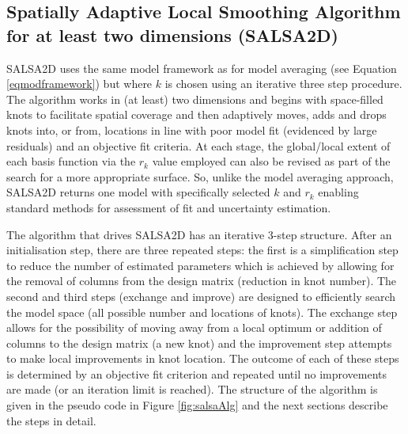 \documentclass[letterpaper]{interact}
\begin{document}
\subsection{Spatially Adaptive Local Smoothing Algorithm for at least two dimensions (SALSA2D)}\label{spatially-adaptive-local-smoothing-algorithm-for-at-least-two-dimensions-salsa2d}

SALSA2D uses the same model framework as for model averaging (see Equation \ref{eqmodframework}) but where $k$ is chosen using an iterative three step procedure. The algorithm works in (at least) two dimensions and begins with space-filled knots to facilitate spatial coverage and then adaptively moves, adds and drops knots into, or from, locations in line with poor model fit (evidenced by large residuals) and an objective fit criteria. At each stage, the global/local extent of each basis function via the \(r_k\) value employed can also be revised as part of the search for a more appropriate surface. So, unlike the model averaging approach, SALSA2D returns one model with specifically selected $k$ and $r_k$ enabling standard methods for assessment of fit and uncertainty estimation. 

The algorithm that drives SALSA2D has an iterative 3-step structure. After an initialisation step, there are three repeated steps: the first is a simplification step to reduce the number of estimated parameters which is achieved by allowing for the removal of columns from the design matrix (reduction in knot number). The second and third steps (exchange and improve) are designed to efficiently search the model space (all possible number and locations of knots). The exchange step allows for the possibility of moving away from a local optimum or addition of columns to the design matrix (a new knot) and the improvement step attempts to make local improvements in knot location. The outcome of each of these steps is determined by an objective fit criterion and repeated until no improvements are made (or an iteration limit is reached). The structure of the algorithm is given in the pseudo code in Figure \ref{fig:salsaAlg} and the next sections describe the steps in detail.
\end{document}
